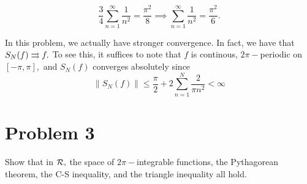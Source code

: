 \documentclass[11pt]{article}
\begin{document}
\begin{problem}
\begin{enumerate}
\begin{solution}
\[\frac{3}{4}\sum_{n=1}^\infty \frac{1}{n^2} = \frac{\pi^2}{8} \implies \sum_{n=1}^\infty \frac{1}{n^2} = \frac{\pi^2}{6}.\]
   \end{solution}   
\begin{reflection}
    In this problem, we actually have stronger convergence. In fact, we have that $S_N(f)\overset{}{\rightrightarrows} f.$ To see this, it suffices to note that $f$ is continous, $2\pi-$periodic on $[-\pi, \pi],$ and $S_N(f)$ converges absolutely since 
    \[\|S_N(f)\| \leq \frac{\pi}{2} + 2\sum_{n=1}^N \frac{2}{\pi n^2} < \infty\]
\end{reflection}
    \end{enumerate}
\end{problem}



\newpage
\section*{Problem 3}
\begin{problem}
    Show that in $\cal R,$ the space of $2\pi-$integrable functions, the Pythagorean theorem, the C-S inequality, and the triangle inequality all hold.
\end{problem}
\end{document}

